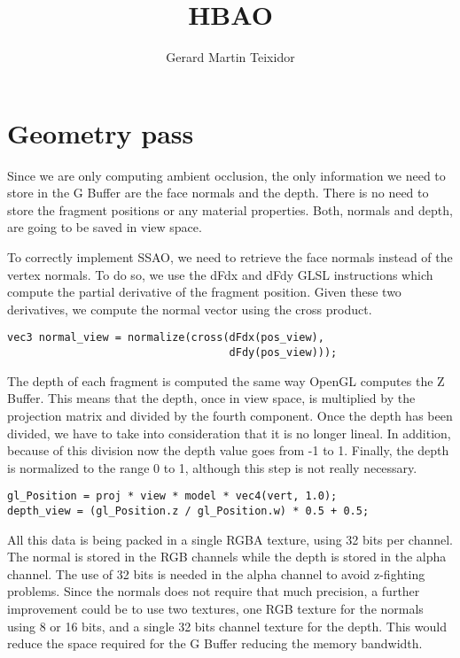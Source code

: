 \documentclass{article}
\title{HBAO}
\author{Gerard Martin Teixidor}
\begin{document}
\maketitle

\section*{Geometry pass}
Since we are only computing ambient occlusion, the only information we need to store in the G Buffer are the face normals and the depth. There is no need to store the fragment positions or any material properties. Both, normals and depth, are going to be saved in view space.

To correctly implement SSAO, we need to retrieve the face normals instead of the vertex normals. To do so, we use the dFdx and dFdy GLSL instructions which compute the partial derivative of the fragment position. Given these two derivatives, we compute the normal vector using the cross product.

\begin{lstlisting}
vec3 normal_view = normalize(cross(dFdx(pos_view),
                                   dFdy(pos_view)));
\end{lstlisting}

The depth of each fragment is computed the same way OpenGL computes the Z Buffer. This means that the depth, once in view space, is multiplied by the projection matrix and divided by the fourth component. Once the depth has been divided, we have to take into consideration that it is no longer lineal. In addition, because of this division now the depth value goes from -1 to 1. Finally, the depth is normalized to the range 0 to 1, although this step is not really necessary.

\begin{lstlisting}
gl_Position = proj * view * model * vec4(vert, 1.0);
depth_view = (gl_Position.z / gl_Position.w) * 0.5 + 0.5;
\end{lstlisting}

All this data is being packed in a single RGBA texture, using 32 bits per channel. The normal is stored in the RGB channels while the depth is stored in the alpha channel. The use of 32 bits is needed in the alpha channel to avoid z-fighting problems. Since the normals does not require that much precision, a further improvement could be to use two textures, one RGB texture for the normals using 8 or 16 bits, and a single 32 bits channel texture for the depth. This would reduce the space required for the G Buffer reducing the memory bandwidth.
\end{document}
